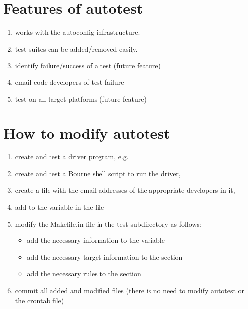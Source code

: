 \section{Features of autotest}
\label{Features of autotest}

\begin{enumerate}
\item works with the autoconfig infrastructure.
\item test suites can be added/removed easily.
\item identify failure/success of a test (future feature)
\item email code developers of test failure
\item test on all target platforms (future feature)
\end{enumerate}

\section{How to modify autotest}
\label{How to modify autotest}

\begin{enumerate}
\item create and test a driver program, e.g. 
\item create and test a Bourne shell script to run the driver,
\item create a file with the email addresses of the appropriate
developers in it, 
\item add  to the  variable
in the  file
\item modify the Makefile.in file in the test subdirectory as follows:
  \begin{itemize}
  \item add the necessary information to the  variable
  \item add the necessary target information to the  section
  \item add the necessary rules to the  section
  \end{itemize}
\item commit all added and modified files (there is no need to
modify autotest or the crontab file)
\end{enumerate}

